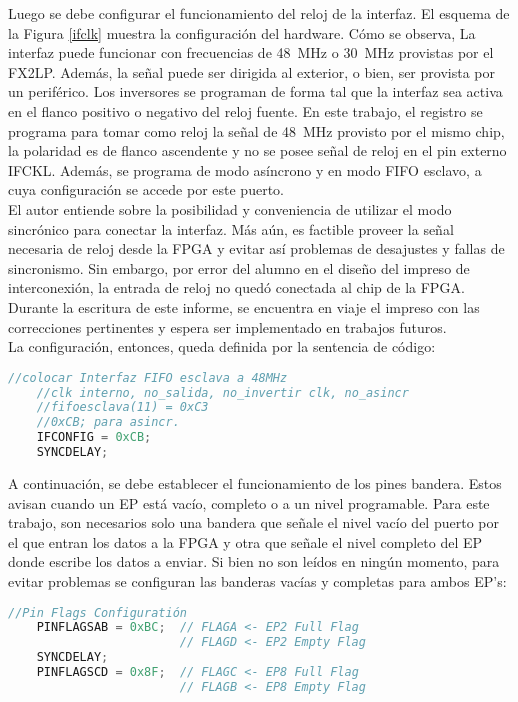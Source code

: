	
	Luego se debe configurar el funcionamiento del reloj de la interfaz. El esquema de la Figura \ref{ifclk} muestra la configuración del hardware. Cómo se observa, La interfaz puede funcionar con frecuencias de \SI{48}{\mega\hertz} o \SI{30}{\mega\hertz} provistas por el FX2LP. Además, la señal puede ser dirigida al exterior, o bien, ser provista por un periférico. Los inversores se programan de forma tal que la interfaz sea activa en el flanco positivo o negativo del reloj fuente. En este trabajo, el registro se programa para tomar como reloj la señal de \SI{48}{\mega\hertz} provisto por el mismo chip, la polaridad es de flanco ascendente y no se posee señal de reloj en el pin externo IFCKL. Además, se programa de modo asíncrono y en modo FIFO esclavo, a cuya configuración se accede por este puerto.\\
	
	El autor entiende sobre la posibilidad y conveniencia de utilizar el modo sincrónico para conectar la interfaz. Más aún, es factible proveer la señal necesaria de reloj desde la FPGA y evitar así problemas de desajustes y fallas de sincronismo. Sin embargo, por error del alumno en el diseño del impreso de interconexión, la entrada de reloj no quedó conectada al chip de la FPGA. Durante la escritura de este informe, se encuentra en viaje el impreso con las correcciones pertinentes y espera ser implementado en trabajos futuros.\\
	
	La configuración, entonces, queda definida por la sentencia de código:
	
%	
	\begin{lstlisting}[language=C,backgroundcolor=\color{gray!30}]
	//colocar Interfaz FIFO esclava a 48MHz
	//clk interno, no_salida, no_invertir clk, no_asincr
	//fifoesclava(11) = 0xC3
	//0xCB; para asincr.
	IFCONFIG = 0xCB;
	SYNCDELAY;
	\end{lstlisting}
		
	A continuación, se debe establecer el funcionamiento de los pines bandera. Estos avisan cuando un EP está vacío, completo o a un nivel programable. Para este trabajo, son necesarios solo una bandera que señale el nivel vacío del puerto por el que entran los datos a la FPGA y otra que señale el nivel completo del EP donde escribe los datos a enviar. Si bien no son leídos en ningún momento, para evitar problemas se configuran las banderas vacías y completas para ambos EP's:
	
%	
	\begin{lstlisting}[language=C,backgroundcolor=\color{gray!30}]
	//Pin Flags Configuratión
	PINFLAGSAB = 0xBC;	// FLAGA <- EP2 Full Flag
						// FLAGD <- EP2 Empty Flag
	SYNCDELAY;
	PINFLAGSCD = 0x8F;	// FLAGC <- EP8 Full Flag
						// FLAGB <- EP8 Empty Flag
	\end{lstlisting}
	
